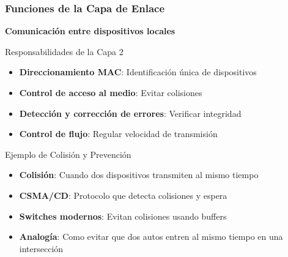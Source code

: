 \documentclass[aspectratio=169]{beamer}
\begin{document}
            \begin{frame}
            \frametitle{Funciones de la Capa de Enlace}
            
            \begin{center}
            \Large \textbf{Comunicación entre dispositivos locales}
            \end{center}
            
            \begin{block}{Responsabilidades de la Capa 2}
            \begin{itemize}
            \item \textbf{Direccionamiento MAC}: Identificación única de dispositivos
            \item \textbf{Control de acceso al medio}: Evitar colisiones
            \item \textbf{Detección y corrección de errores}: Verificar integridad
            \item \textbf{Control de flujo}: Regular velocidad de transmisión
            \end{itemize}
            \end{block}
            
            \begin{block}{Ejemplo de Colisión y Prevención}
            \begin{itemize}
            \item \textbf{Colisión}: Cuando dos dispositivos transmiten al mismo tiempo
            \item \textbf{CSMA/CD}: Protocolo que detecta colisiones y espera
            \item \textbf{Switches modernos}: Evitan colisiones usando buffers
            \item \textbf{Analogía}: Como evitar que dos autos entren al mismo tiempo en una intersección
            \end{itemize}
            \end{block}
            \end{frame}
            
\end{document}
